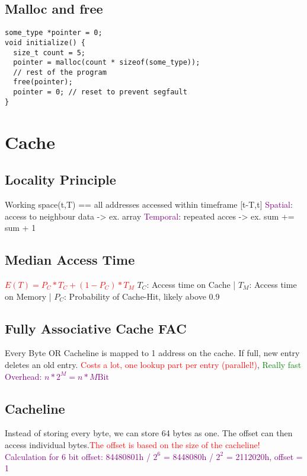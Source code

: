 \documentclass[main.tex,fontsize=8pt,paper=a4,paper=landscape,DIV=calc,]{scrartcl}
\begin{document}
\begin{multicols*}{4}
\subsection{Malloc and free}
\vspace{-2.5mm}
\begin{lstlisting}
some_type *pointer = 0;
void initialize() {
  size_t count = 5;
  pointer = malloc(count * sizeof(some_type));
  // rest of the program 
  free(pointer);
  pointer = 0; // reset to prevent segfault
}
\end{lstlisting}
\vspace{2mm}

\section{Cache}

\subsection{Locality Principle}
Working space(t,T) == all addresses accessed within timeframe [t-T,t] \newline
\textcolor{purple}{Spatial}: access to neighbour data -> ex. array\newline
\textcolor{purple}{Temporal}: repeated acces -> ex. sum += sum + 1

\subsection{Median Access Time}
\textcolor{red}{\(E(T) = P_C * T_C + (1 - P_C )* T_M\)}\newline
\(T_C\): Access time on Cache |
\(T_M\): Access time on Memory |
\(P_C\): Probability of Cache-Hit, likely above 0.9

\subsection{Fully Associative Cache FAC}
Every Byte OR Cacheline is mapped to 1 address on the cache. If full, new entry deletes an old entry.
\textcolor{red}{Costs a lot, one lookup part per entry (parallel!)}, \textcolor{green}{Really fast}\newline
\textcolor{purple}{Overhead: \(n * 2^M = n * M \text{Bit}\)}

\subsection{Cacheline}
Instead of storing every byte, we can store 64 bytes as one. The offset can then access individual bytes.\newline \textcolor{red}{The offset is based on the size of the cacheline!}
\textcolor{purple}{Calculation for 6 bit offset: 84480801h / \(2^6\) = 8448080h / \(2^2\) = 2112020h, offset = 1 }


\end{multicols*}
\end{document}
